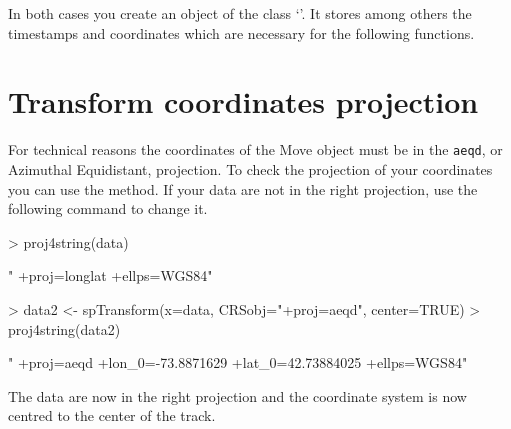\documentclass[article,nojss]{jss}
\newcommand{\fct}[1]{{\code{#1()}}}
\newcommand{\class}[1]{{`\code{#1}'}}
\begin{document}
\begin{Schunk}
\end{Schunk}

In both cases you create an object of the class \class{Move}. It stores among others the timestamps and coordinates which are necessary for the following functions. 

\section*{Transform coordinates projection}
For technical reasons the coordinates of the Move object must be in the \texttt{aeqd}, or Azimuthal Equidistant, projection. To check the projection of your coordinates you can use the \fct{proj4string} method. If your data are not in the right projection, use the following command to change it. 

\begin{Schunk}
\begin{Sinput}
> proj4string(data)
\end{Sinput}
\begin{Soutput}
[1] " +proj=longlat +ellps=WGS84"
\end{Soutput}
\begin{Sinput}
> data2 <- spTransform(x=data, CRSobj="+proj=aeqd", center=TRUE)  
> proj4string(data2)
\end{Sinput}
\begin{Soutput}
[1] " +proj=aeqd +lon_0=-73.8871629 +lat_0=42.73884025 +ellps=WGS84"
\end{Soutput}
\end{Schunk}
The data are now in the right projection and the coordinate system is now centred to the center of the track. 

\end{document}
